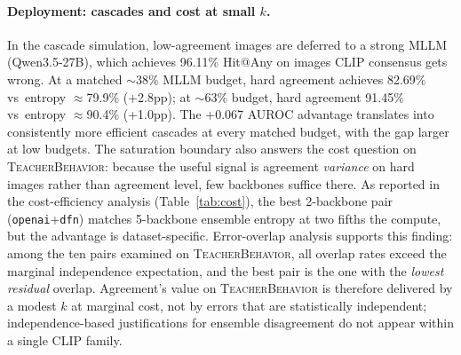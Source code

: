 \documentclass[a4paper,fleqn]{cas-sc}
\newcommand{\tb}{\textsc{TeacherBehavior}}
\begin{document}
\paragraph{Deployment: cascades and cost at small $k$.}
\label{sec:deployment}
In the cascade simulation, low-agreement images are deferred to a strong MLLM (Qwen3.5-27B), which achieves 96.11\% Hit@Any on images CLIP consensus gets wrong.
At a matched $\sim$38\% MLLM budget, hard agreement achieves 82.69\% vs~entropy $\approx$79.9\% (+2.8pp); at $\sim$63\% budget, hard agreement 91.45\% vs~entropy $\approx$90.4\% (+1.0pp).
The +0.067 AUROC advantage translates into consistently more efficient cascades at every matched budget, with the gap larger at low budgets.
The saturation boundary also answers the cost question on \tb{}: because the useful signal is agreement \emph{variance} on hard images rather than agreement level, few backbones suffice there.
As reported in the cost-efficiency analysis (Table~\ref{tab:cost}), the best 2-backbone pair (\texttt{openai}+\texttt{dfn}) matches 5-backbone ensemble entropy at two fifths the compute, but the advantage is dataset-specific.
Error-overlap analysis supports this finding: among the ten pairs examined on \tb{}, all overlap rates exceed the marginal independence expectation, and the best pair is the one with the \emph{lowest residual} overlap.
Agreement's value on \tb{} is therefore delivered by a modest $k$ at marginal cost, not by errors that are statistically independent; independence-based justifications for ensemble disagreement do not appear within a single CLIP family.
\end{document}

